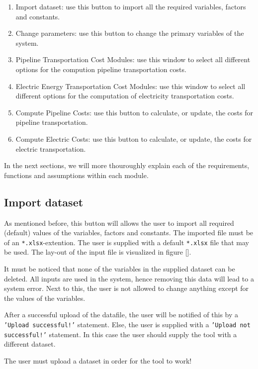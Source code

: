 \documentclass{article}
\begin{document}
\begin{enumerate}
	\item Import dataset: use this button to import all the required variables, factors and constants.  
	\item Change parameters: use this button to change the primary variables of the system. 
	\item Pipeline Transportation Cost Modules: use this window to select all different options for the compution pipeline transportation costs.
	\item Electric Energy Transportation Cost Modules: use this window to select all different options for the computation of electricity transportation costs.
	\item Compute Pipeline Costs: use this button to calculate, or update, the costs for pipeline transportation.
	\item Compute Electric Costs: use this button to calculate, or update, the costs for electric transportation.
\end{enumerate}

In the next sections, we will more thouroughly explain each of the requirements, functions and assumptions within each module. 

\subsection{Import dataset}
As mentioned before, this button will allows the user to import all required (default) values of the variables, factors and constants. The imported file must be of an \texttt{*.xlsx}-extention. The user is supplied with a default \texttt{*.xlsx} file that may be used. The lay-out of the input file is visualized in figure [].
\begin{warn}
	It must be noticed that none of the variables in the supplied dataset can be deleted. All inputs are used in the system, hence removing this data will lead to a system error. Next to this, the user is not allowed to change anything except for the values of the variables.
\end{warn}
 
 After a successful upload of the datafile, the user will be notified of this by a \texttt{'Upload successful!'} statement. Else, the user is supplied with a \texttt{'Upload not successful!'} statement. In this case the user should supply the tool with a different dataset.
 
 \begin{warn}
 	The user must upload a dataset in order for the tool to work!
 \end{warn}
\end{document}
